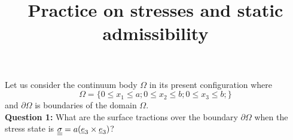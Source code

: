 \documentclass[letter,12pt]{article}
\begin{document}
\pagestyle{fancy}

\title{\textbf{Practice on stresses and static admissibility}}
\date{}

\maketitle

\vspace{-1cm}

Let us consider the continuum body $\Omega$ in its present configuration where 
\begin{equation}
\Omega = \{ 0 \le x_1 \le a; 0 \le x_2 \le b; 0 \le x_3\le b;\}
\end{equation}
and $\partial \Omega$ is boundaries of the domain $\Omega$. \\

\noindent \textbf{Question 1:} What are the surface tractions over the boundary $\partial \Omega$ when the stress state is $\underline{\underline{\sigma}} = a (\underline{e}_3 \times \underline{e}_3)$? \\
\end{document}
